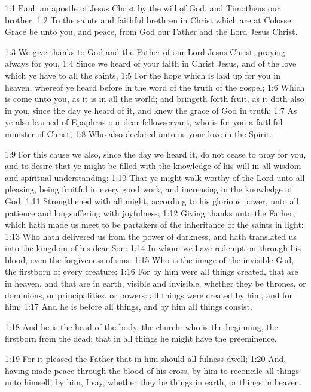 

1:1 Paul, an apostle of Jesus Christ by the will of God, and Timotheus our brother, 1:2 To the saints and faithful brethren in Christ which are at Colosse: Grace be unto you, and peace, from God our Father and the Lord Jesus Christ.

1:3 We give thanks to God and the Father of our Lord Jesus Christ, praying always for you, 1:4 Since we heard of your faith in Christ Jesus, and of the love which ye have to all the saints, 1:5 For the hope which is laid up for you in heaven, whereof ye heard before in the word of the truth of the gospel; 1:6 Which is come unto you, as it is in all the world; and bringeth forth fruit, as it doth also in you, since the day ye heard of it, and knew the grace of God in truth: 1:7 As ye also learned of Epaphras our dear fellowservant, who is for you a faithful minister of Christ; 1:8 Who also declared unto us your love in the Spirit.

1:9 For this cause we also, since the day we heard it, do not cease to pray for you, and to desire that ye might be filled with the knowledge of his will in all wisdom and spiritual understanding; 1:10 That ye might walk worthy of the Lord unto all pleasing, being fruitful in every good work, and increasing in the knowledge of God; 1:11 Strengthened with all might, according to his glorious power, unto all patience and longsuffering with joyfulness; 1:12 Giving thanks unto the Father, which hath made us meet to be partakers of the inheritance of the saints in light: 1:13 Who hath delivered us from the power of darkness, and hath translated us into the kingdom of his dear Son: 1:14 In whom we have redemption through his blood, even the forgiveness of sins: 1:15 Who is the image of the invisible God, the firstborn of every creature: 1:16 For by him were all things created, that are in heaven, and that are in earth, visible and invisible, whether they be thrones, or dominions, or principalities, or powers: all things were created by him, and for him: 1:17 And he is before all things, and by him all things consist.

1:18 And he is the head of the body, the church: who is the beginning, the firstborn from the dead; that in all things he might have the preeminence.

1:19 For it pleased the Father that in him should all fulness dwell; 1:20 And, having made peace through the blood of his cross, by him to reconcile all things unto himself; by him, I say, whether they be things in earth, or things in heaven.


